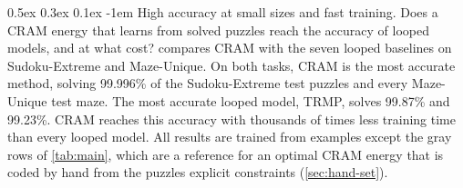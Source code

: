 \documentclass{article}
\makeatletter
\newcommand{\CRAM}{\textsc{CRAM}}
\renewcommand{\paragraph}{%
  \@startsection{paragraph}{4}{\z@}%
                {0.5ex \@plus 0.3ex \@minus 0.1ex}%
                {-1em}%
                {\normalsize\bf}%
}
\makeatother
\begin{document}
\paragraph{High accuracy at small sizes and fast training.}
Does a \CRAM{} energy that learns from solved puzzles reach the accuracy of looped models, and at what cost?
 compares \CRAM{} with the seven looped baselines on Sudoku-Extreme and Maze-Unique.
On both tasks, \CRAM{} is the most accurate method, solving 99.996\% of the Sudoku-Extreme test puzzles and every Maze-Unique test maze.
The most accurate looped model, TRMP, solves 99.87\% and 99.23\%.
\CRAM{} reaches this accuracy with thousands of times less training time than every looped model.
All results are trained from examples except the gray rows of \cref{tab:main}, which are a reference for an optimal \CRAM{} energy that is coded by hand from the puzzles explicit constraints (\cref{sec:hand-set}).
\end{document}

